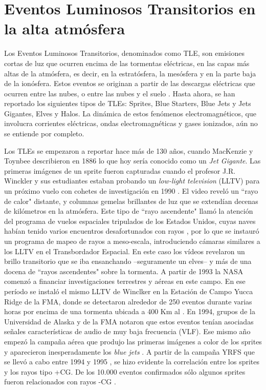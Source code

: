 \documentclass[12pt,oneside,openany,letter]{book}
\begin{document}
\chapter{Eventos Luminosos Transitorios en la alta atmósfera}\label{TLEs}
Los Eventos Luminosos Transitorios, denominados como TLE, son emisiones cortas de luz que ocurren encima de las tormentas eléctricas, en las capas más altas de la atmósfera, es decir, en la estratósfera, la mesósfera y en la parte baja de la ionósfera. Estos eventos se originan a partir de las descargas eléctricas que ocurren entre las nubes, o entre las nubes y el suelo \cite{DwyerUman2014}. Hasta ahora, se han reportado los siguientes tipos de TLEs: Sprites, Blue Starters, Blue Jets y Jets Gigantes, Elves y Halos. La dinámica de estos fenómenos electromagnéticos, que involucra corrientes eléctricas, ondas electromagnéticas y gases ionizados, aún no se entiende por completo.

Los TLEs se empezaron a reportar hace más de 130 años, cuando MacKenzie y Toynbee describieron en 1886 \cite{FullekrugEtal2006} lo que hoy sería conocido como un \textit{Jet Gigante}. Las primeras imágenes de un sprite fueron capturadas cuando el profesor J.R. Winckler y sus estudiantes estaban probando un \textit{low-light television} (LLTV) para un próximo vuelo con cohetes de investigación en 1990 \cite{FranzEtal1990}. El video reveló un ``rayo de calor" distante, y columnas gemelas brillantes de luz que se extendían decenas de kilómetros en la atmósfera. Este tipo de ``rayo ascendente" llamó la atención del programa de vuelos espaciales tripulados de los Estados Unidos, cuyas naves habían tenido varios encuentros desafortunados con rayos \cite{UmanRakov2003}, por lo que se instauró un programa de mapeo de rayos a meso-escala, introduciendo cámaras similares a los LLTV en el Transbordador Espacial. En este caso los vídeos revelaron un brillo transitorio que se iba ensanchando --seguramente un elves-- y más de una docena de ``rayos ascendentes" sobre la tormenta. A partir de 1993 la NASA comenzó a financiar investigaciones terrestres y aéreas en este campo. En ese período se instaló el mismo LLTV de Winclker en la Estación de Campo Yucca Ridge de la FMA, donde se detectaron alrededor de 250 eventos durante varias horas por encima de una tormenta ubicada a 400 Km al  \cite{Lyons1994A, Lyons1994B}. En 1994, grupos de la Universidad de Alaska y de la FMA notaron que estos eventos tenían asociadas señales características de audio de muy baja frecuencia (VLF). Ese mismo año empezó la campaña aérea que produjo las primeras imágenes a color de los sprites y aparecieron inesperadamente los \textit{blue jets} \cite{SentmanEtal1995}. A partir de la campaña YRFS que se llevó a cabo entre 1994 y 1995 \cite{Lyons1996B}, se hizo evidente la correlación entre los sprites y los rayos tipo +CG. De los 10.000 eventos confirmados sólo algunos sprites fueron relacionados con rayos -CG \cite{BarringtonEtal1999}. 
\end{document}
